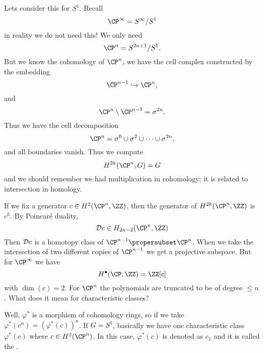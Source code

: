 Lets consider this for $S^{1}$. Recall 
\begin{equation}
\CP^{\infty}=S^{\infty}/S^{1}
\end{equation}
in reality we do not need this! We only need
\begin{equation}
\CP^{n}=S^{2n+1}/S^{1}.
\end{equation}
But we know the cohomology of $\CP^{n}$, we have the cell
complex constructed by the embedding
\begin{equation}
\CP^{n-1}\Into\CP^{n},
\end{equation}
and
\begin{equation}
\CP^{n}\setminus\CP^{n-1}=\sigma^{2n}.
\end{equation}
Thus we have the cell decomposition
\begin{equation}
\CP^{n}=\sigma^{0}\cup\sigma^{2}\cup\dots\cup\sigma^{2n},
\end{equation}
and all boundaries vanish. Thus we compute
\begin{equation}
H^{2k}(\CP^{n},G)=G
\end{equation}
and we should remember we had multiplication in cohomology; it is
related to intersection in homology.

If we fix a generator $c\in H^{2}(\CP^{n},\ZZ)$, then the
generator of $H^{2k}(\CP^{n},\ZZ)$ is $c^{k}$. By Poincar\'e
  duality, 
\begin{equation}
\poincareDual{c}\in H_{2n-2}(\CP^{n},\ZZ)
\end{equation}
Then $\mathcal{D}c$ is a homotopy class of
$\CP^{n-1}\propersubset\CP^{n}$. When we take the intersection of
two different copies of $\CP^{n-1}$ we get a projective
subspace. But for $\CP^{\infty}$ we have 
\begin{equation}
H^{\bullet}(\CP,\ZZ)=\ZZ[c]
\end{equation}
with $\dim(c)=2$. For $\CP^{n}$ the polynomials are truncated to
be of degree $\leq n$. What does it mean for characteristic
classes?

Well, $\varphi^{*}$ is a morphism of cohomology rings, so if we
take $\varphi^{*}(c^{n})=\left(\varphi^{*}(c)\right)^{n}$. If
$G=S^{1}$, basically we have one characteristic class
$\varphi^{*}(c)$ where $c\in H^{2}(\CP^{n})$. In this case,
$\varphi^{*}(c)$ is denoted as $c_{1}$ and it is called the
.


